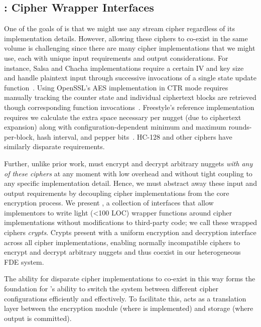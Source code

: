 \subsection{\sysB: Cipher Wrapper Interfaces}\label{subsec:des-crypts}

One of the goals of \sys is that we might use any stream cipher regardless of
its implementation details. However, allowing these ciphers to co-exist in the
same volume is challenging since there are many cipher implementations that we
might use, each with unique input requirements and output considerations. For
instance, Salsa and Chacha implementations require a certain IV and key size and
handle plaintext input through successive invocations of a single state update
function~\cite{Floodyberry}. Using OpenSSL's AES implementation in CTR mode
requires manually tracking the counter state and individual ciphertext blocks
are retrieved though corresponding function invocations~\cite{OpenSSL}.
Freestyle's reference implementation requires we calculate the extra space
necessary per nugget (due to ciphertext expansion) along with
configuration-dependent minimum and maximum rounds-per-block, hash interval, and
pepper bits~\cite{Freestyle}. HC-128 and other ciphers have similarly disparate
requirements.

Further, unlike prior work, \sys must encrypt and decrypt arbitrary nuggets {\em
with any of these ciphers} at any moment with low overhead and without tight
coupling to any specific implementation detail. Hence, we must abstract away
these input and output requirements by decoupling cipher implementations from
the core encryption process. We present \sysB, a collection of interfaces that
allow implementors to write light (<100 LOC) wrapper functions around cipher
implementations without modifications to third-party code; we call these wrapped
ciphers {\em crypts}. Crypts present \sys with a uniform encryption and
decryption interface across all cipher implementations, enabling normally
incompatible ciphers to encrypt and decrypt arbitrary nuggets and thus coexist
in our heterogeneous FDE system.

The ability for disparate cipher implementations to co-exist in this way forms
the foundation for \sys's ability to switch the system between different cipher
configurations efficiently and effectively. To facilitate this, \sysB acts as a
translation layer between the encryption module (where \sysA is implemented) and
storage (where \sysB output is committed).

